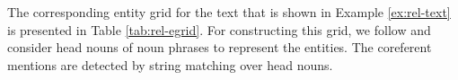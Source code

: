 



%

The corresponding entity grid for the text that is shown in Example \ref{ex:rel-text} is presented in Table \ref{tab:rel-egrid}. 
For constructing this grid, we follow  and consider head nouns of noun phrases to represent the entities.  
The coreferent mentions are detected by string matching over head nouns. 

